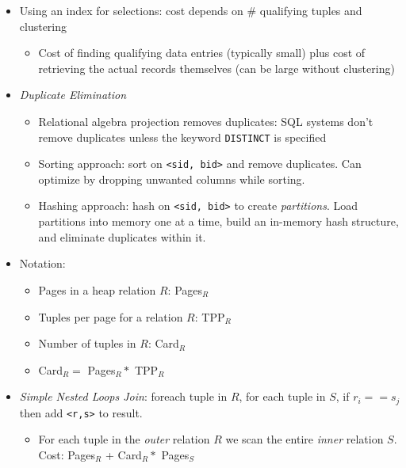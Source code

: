 \documentclass[landscape,8pt]{extarticle}
\newcommand{\code}{\lstinline}
\begin{document}
\begin{multicols}{5}
\begin{itemize}
\begin{itemize}
\begin{itemize}
                        \end{itemize}
                  \item Using an index for selections: cost depends on \# qualifying tuples and clustering
                        \begin{itemize}
                            \item Cost of finding qualifying data entries (typically small) plus cost of retrieving the actual records themselves (can be large without clustering)
                        \end{itemize}
                  \item \emph{Duplicate Elimination}
                        \begin{itemize}
                            \item Relational algebra projection removes duplicates: SQL systems don't remove duplicates unless the keyword \code{DISTINCT} is specified
                            \item Sorting approach: sort on \code{<sid, bid>} and remove duplicates. Can optimize by dropping unwanted columns while sorting.
                            \item Hashing approach: hash on \code{<sid, bid>} to create \emph{partitions}. Load partitions into memory one at a time, build an in-memory hash structure, and eliminate duplicates within it.
                        \end{itemize}
                  \item Notation:
                        \begin{itemize}
                            \item Pages in a heap relation $R$: Pages$_R$
                            \item Tuples per page for a relation $R$: TPP$_R$
                            \item Number of tuples in $R$: Card$_R$
                            \item Card$_R = $ Pages$_R * $ TPP$_R$
                        \end{itemize}
                  \item \emph{Simple Nested Loops Join}: foreach tuple in $R$, for each tuple in $S$, if $r_i == s_j$ then add \code{<r,s>} to result.
                        \begin{itemize}
                            \item For each tuple in the \emph{outer} relation $R$ we scan the entire \emph{inner} relation $S$. Cost: Pages$_R$ + Card$_R * $ Pages$_S$

\end{itemize}
\end{itemize}
\end{itemize}
\end{multicols}
\end{document}
